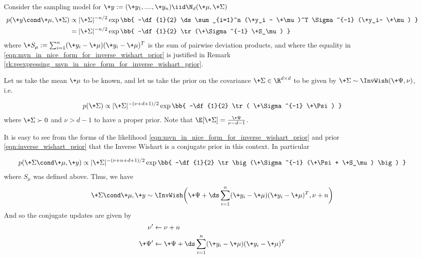 \documentclass{article} %
\begin{document}
\begin{example}{} \label{ex:inverse_wishart_prior}



Consider the sampling model for $\+y :=(\+y_1, ....,\+y_n) \iid \N_d(\+\mu,  \+\Sigma)$
\begin{align}
p(\+y \cond \+\mu, \+\Sigma) & \propto | \+\Sigma |^{-n/2} \exp \bb{ -\df{1}{2} \ds\sum_{i=1}^n (\+y_i - \+\mu)^T  \Sigma^{-1} (\+y_i- \+\mu) } \nonumber \\
& = | \+\Sigma |^{-n/2} \exp \bb{ -\df{1}{2} \tr(\+\Sigma^{-1} \+S_\mu)  }\label{eqn:mvn_in_nice_form_for_inverse_wishart_prior}
\end{align}
where $\+S_\mu := \sum_{i=1}^n (\+y_i - \+\mu) (\+y_i - \+\mu)^T$ is the sum of pairwise deviation products,  and where the equality in \eqref{eqn:mvn_in_nice_form_for_inverse_wishart_prior}  is justified in Remark \ref{rk:reexpressing_mvn_in_nice_form_for_inverse_wishart_prior}.

Let us take the mean $\+\mu$ to be known,  and let us take the prior on the covariance $\+\Sigma \in \R^{d \times d}$ to be given by $\+\Sigma \sim \InvWish(\+\Psi, \nu)$, i.e.

\begin{align}
p(\+\Sigma) \propto | \+\Sigma|^{-(\nu+d +1) /2}  \exp \bb{ -\df{1}{2} \tr ( \+\Sigma^{-1} \+\Psi) } 
\label{eqn:inverse_wishart_prior}
\end{align}
where $\+\Sigma \succ 0$ and $\nu > d-1$ to have a proper prior.   Note that $\E[\+\Sigma] = \frac{\+\Psi}{\nu -d -1}$.

It is easy to see from the forms of the likelihood \eqref{eqn:mvn_in_nice_form_for_inverse_wishart_prior} and prior \eqref{eqn:inverse_wishart_prior} that the Inverse Wishart is a conjugate prior in this context.  In particular

\begin{align}
p(\+\Sigma \cond \+\mu,  \+y) \propto | \+\Sigma|^{-(\nu+ n + d +1) /2}  \exp \bb{ -\df{1}{2} \tr \big(\+\Sigma^{-1} (\+\Psi + \+S_\mu) \big) } 
\label{eqn:inverse_wishart_posterior}
\end{align}
where $S_\mu$ was defined above.  Thus,  we have 
\[ \+\Sigma \cond \+\mu,  \+y \sim \InvWish \bigg( \+\Psi +  \ds\sum_{i=1}^n (\+y_i - \+\mu) (\+y_i - \+\mu)^T,  \nu + n \bigg) \]
And so the conjugate updates are given by
\begin{align}
\nu^\prime &\leftarrow  \nu + n \\
\+\Psi^\prime &\leftarrow \+\Psi + \ds\sum_{i=1}^n (\+y_i - \+\mu) (\+y_i - \+\mu)^T
\end{align}
\end{example}
\end{document}
